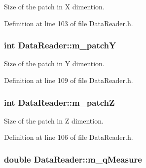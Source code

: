Size of the patch in X dimention. 



Definition at line 103 of file Data\+Reader.\+h.

\subsubsection[{\texorpdfstring{m\+\_\+patchY}{m_patchY}}]{\setlength{\rightskip}{0pt plus 5cm}int Data\+Reader\+::m\+\_\+patchY\hspace{0.3cm}{\ttfamily [private]}}\hypertarget{classDataReader_aed3b404cf78c6973363402e5e871e46a}{}\label{classDataReader_aed3b404cf78c6973363402e5e871e46a}


Size of the patch in Y dimention. 



Definition at line 109 of file Data\+Reader.\+h.

\subsubsection[{\texorpdfstring{m\+\_\+patchZ}{m_patchZ}}]{\setlength{\rightskip}{0pt plus 5cm}int Data\+Reader\+::m\+\_\+patchZ\hspace{0.3cm}{\ttfamily [private]}}\hypertarget{classDataReader_a68b54683e0e0581e3dd76874ea5b6941}{}\label{classDataReader_a68b54683e0e0581e3dd76874ea5b6941}


Size of the patch in Z dimention. 



Definition at line 106 of file Data\+Reader.\+h.

\subsubsection[{\texorpdfstring{m\+\_\+q\+Measure}{m_qMeasure}}]{\setlength{\rightskip}{0pt plus 5cm}double Data\+Reader\+::m\+\_\+q\+Measure\hspace{0.3cm}{\ttfamily [private]}}\hypertarget{classDataReader_a5bba6f4ec228522330fda878214f7395}{}\label{classDataReader_a5bba6f4ec228522330fda878214f7395}


